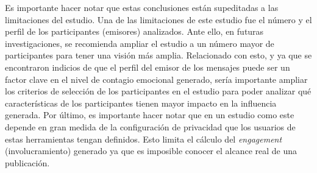 \documentclass[spanish]{textolivre}
\begin{document}
Es importante hacer notar que estas conclusiones están supeditadas a las limitaciones del estudio. Una de las limitaciones de este estudio fue el número y el perfil de los participantes (emisores) analizados. Ante ello, en futuras investigaciones, se recomienda ampliar el estudio a un número mayor de participantes para tener una visión más amplia. Relacionado con esto, y ya que se encontraron indicios de que el perfil del emisor de los mensajes puede ser un factor clave en el nivel de contagio emocional generado, sería importante ampliar los criterios de selección de los participantes en el estudio para poder analizar qué características de los participantes tienen mayor impacto en la influencia generada. Por último, es importante hacer notar que en un estudio como este depende en gran medida de la configuración de privacidad que los usuarios de estas herramientas tengan definidos. Esto limita el cálculo del \textit{engagement} (involucramiento) generado ya que es imposible conocer el alcance real de una publicación.


\printbibliography\label{sec-bib}
\end{document}
